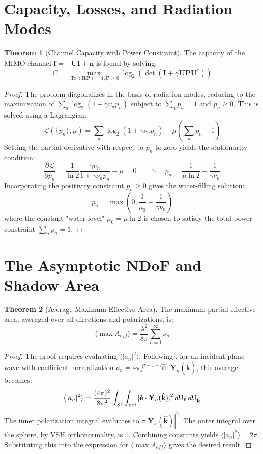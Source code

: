 \documentclass[12pt,a4paper]{article}
\theoremstyle{definition}
\newtheorem{theorem}{Theorem}[section]
\newcommand{\vect}[1]{\mathbf{#1}}
\newcommand{\uvect}[1]{\mathbf{\hat{#1}}}
\newcommand{\herm}{^{\dagger}} %
\newcommand\Tr{\operatorname{Tr}}
\begin{document}
\section{Capacity, Losses, and Radiation Modes}
\label{sec:capacity}

\begin{theorem}[Channel Capacity with Power Constraint]
\label{thm:capacity}
The capacity of the MIMO channel $\vect{f} = -\vect{U}\vect{I} + \vect{n}$ is found by solving:
$$
C = \max_{\Tr(\vect{R}\vect{P})=1, \vect{P}\ge 0} \log_2(\det(\mathbf{I} + \gamma \vect{U}\vect{P}\vect{U}\herm))
$$
\end{theorem}
\begin{proof}
The problem diagonalizes in the basis of radiation modes, reducing to the maximization of $\sum_n \log_2(1 + \gamma \nu_n p_n)$ subject to $\sum_n p_n = 1$ and $p_n \ge 0$. This is solved using a Lagrangian:
$$ \mathcal{L}(\{p_n\}, \mu) = \sum_n \log_2(1 + \gamma \nu_n p_n) - \mu \left(\sum_n p_n - 1\right) $$
Setting the partial derivative with respect to $p_n$ to zero yields the stationarity condition:
$$ \frac{\partial \mathcal{L}}{\partial p_n} = \frac{1}{\ln 2} \frac{\gamma \nu_n}{1 + \gamma \nu_n p_n} - \mu = 0 \quad\implies\quad p_n = \frac{1}{\mu\ln 2} - \frac{1}{\gamma\nu_n} $$
Incorporating the positivity constraint $p_n \ge 0$ gives the water-filling solution:
$$ p_n = \max\left(0, \frac{1}{\mu_0} - \frac{1}{\gamma\nu_n}\right) $$
where the constant "water level" $\mu_0 = \mu\ln2$ is chosen to satisfy the total power constraint $\sum_n p_n=1$.
\end{proof}

\section{The Asymptotic NDoF and Shadow Area}
\label{sec:asymptotic}

\begin{theorem}[Average Maximum Effective Area]
\label{thm:avg_a_eff}
The maximum partial effective area, averaged over all directions and polarizations, is:
$$
\langle \max A_{eff} \rangle = \frac{\lambda^2}{8\pi} \sum_{n=1}^\infty \nu_n
$$
\end{theorem}
\begin{proof}
The proof requires evaluating $\langle |a_n|^2 \rangle$. Following \cite[Appendix B]{Gustafsson2025}, for an incident plane wave with coefficient normalization $a_n = 4\pi j^{\tau-1-l} \uvect{e} \cdot \vect{Y}_n(\uvect{k})$, this average becomes:
$$ \langle |a_n|^2\rangle = \frac{(4\pi)^2}{8\pi^2}\int_{S^2}\int_{\rm pol} |\uvect e\cdot\vect Y_n(\uvect k)|^2\,d\Omega_{\uvect e}\,d\Omega_{\uvect k} $$
The inner polarization integral evaluates to $\pi |\vect{Y}_n(\uvect{k})|^2$. The outer integral over the sphere, by VSH orthonormality, is 1. Combining constants yields $\langle |a_n|^2\rangle = 2\pi$. Substituting this into the expression for $\langle \max A_{eff} \rangle$ gives the desired result.
\end{proof}
\end{document}
